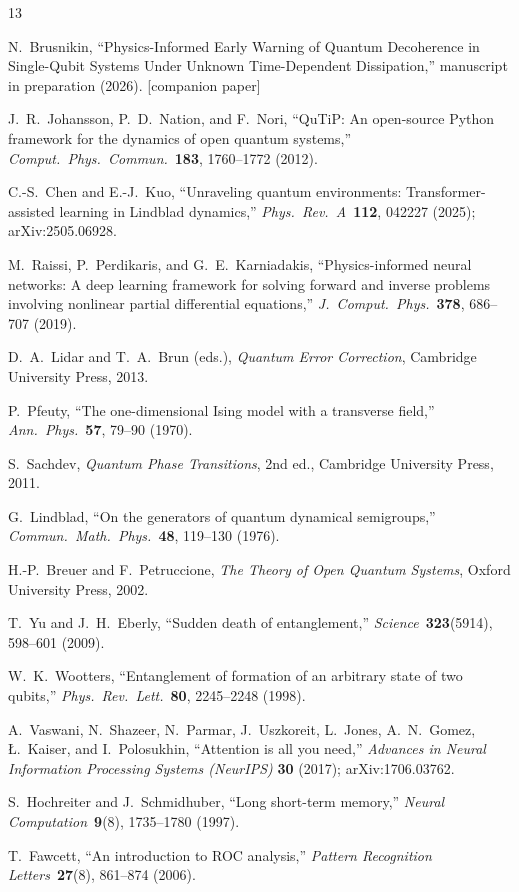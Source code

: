 \documentclass[twocolumn,10pt]{article}
\begin{document}

\begin{thebibliography}{13}

N.~Brusnikin,
``Physics-Informed Early Warning of Quantum Decoherence in Single-Qubit
  Systems Under Unknown Time-Dependent Dissipation,''
manuscript in preparation (2026). [companion paper]

J.~R.~Johansson, P.~D.~Nation, and F.~Nori,
``QuTiP: An open-source Python framework for the dynamics of open
  quantum systems,''
\textit{Comput.\ Phys.\ Commun.}\ \textbf{183}, 1760--1772 (2012).

C.-S.~Chen and E.-J.~Kuo,
``Unraveling quantum environments: Transformer-assisted learning in
  Lindblad dynamics,''
\textit{Phys.\ Rev.\ A}\ \textbf{112}, 042227 (2025); arXiv:2505.06928.

M.~Raissi, P.~Perdikaris, and G.~E.~Karniadakis,
``Physics-informed neural networks: A deep learning framework for
  solving forward and inverse problems involving nonlinear partial
  differential equations,''
\textit{J.\ Comput.\ Phys.}\ \textbf{378}, 686--707 (2019).

D.~A.~Lidar and T.~A.~Brun (eds.),
\textit{Quantum Error Correction},
Cambridge University Press, 2013.

P.~Pfeuty,
``The one-dimensional Ising model with a transverse field,''
\textit{Ann.\ Phys.}\ \textbf{57}, 79--90 (1970).

S.~Sachdev,
\textit{Quantum Phase Transitions},
2nd ed., Cambridge University Press, 2011.

G.~Lindblad,
``On the generators of quantum dynamical semigroups,''
\textit{Commun.\ Math.\ Phys.}\ \textbf{48}, 119--130 (1976).

H.-P.~Breuer and F.~Petruccione,
\textit{The Theory of Open Quantum Systems},
Oxford University Press, 2002.

T.~Yu and J.~H.~Eberly,
``Sudden death of entanglement,''
\textit{Science}\ \textbf{323}(5914), 598--601 (2009).

W.~K.~Wootters,
``Entanglement of formation of an arbitrary state of two qubits,''
\textit{Phys.\ Rev.\ Lett.}\ \textbf{80}, 2245--2248 (1998).

A.~Vaswani, N.~Shazeer, N.~Parmar, J.~Uszkoreit, L.~Jones,
A.~N.~Gomez, {\L}.~Kaiser, and I.~Polosukhin,
``Attention is all you need,''
\textit{Advances in Neural Information Processing Systems (NeurIPS)}
  \textbf{30} (2017); arXiv:1706.03762.

S.~Hochreiter and J.~Schmidhuber,
``Long short-term memory,''
\textit{Neural Computation}\ \textbf{9}(8), 1735--1780 (1997).

T.~Fawcett,
``An introduction to ROC analysis,''
\textit{Pattern Recognition Letters}\ \textbf{27}(8), 861--874 (2006).

\end{thebibliography}
\end{document}
